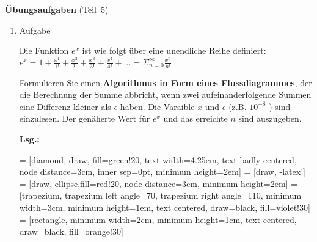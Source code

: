 \documentclass[12pt,a4paper,ngerman]{scrreprt}
\newcommand{\Lsg}{\par \textbf{Lsg.: \hfill }}
\begin{document}
\large{\textbf{Übungsaufgaben} (Teil~5)}

\begin{enumerate}

\item Aufgabe %

Die Funktion $ e^x $ ist wie folgt über eine unendliche Reihe definiert: \\

\begin{math}
e^x = 1 + \frac{x^1}{1!} + \frac{x^2}{2!} + \frac{x^3}{3!} + \frac{x^4}{4!} + ...
= \Sigma_{n=0}^{\infty} \frac{x^n}{n!}
\end{math}

\par Formulieren Sie einen \textbf{Algorithmus in Form eines Flussdiagrammes}, der die Berechnung der Summe abbricht, wenn zwei aufeinanderfolgende Summen eine Differenz kleiner als $\epsilon$ haben.
Die Varaible $x$ und $\epsilon$ (z.B. $10^{-8}$ ) sind einzulesen. Der genäherte Wert für $ e^x $ und das erreichte $ n $ sind auszugeben.

\Lsg

 = [diamond, draw, fill=green!20, 
    text width=4.25em, text badly centered, node distance=3cm, inner sep=0pt,
    minimum height=2em] 
 = [draw, -latex']
 = [draw, ellipse,fill=red!20, node distance=3cm,
    minimum height=2em]
 = [trapezium, trapezium left angle=70, trapezium right angle=110, minimum width=3cm, minimum height=1em, text centered, draw=black, fill=violet!30]
 = [rectangle, minimum width=2cm, minimum height=1cm, text centered, draw=black, fill=orange!30]
\begin{tikzpicture}[node distance = 1.5cm, auto, thick, nodes = {align = center},
    >=latex]


\end{tikzpicture}
\end{enumerate}
\end{document}
